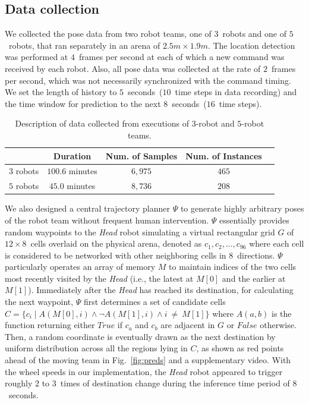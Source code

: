\documentclass[letterpaper, 10 pt, conference]{ieeeconf}  %
\begin{document}
    \subsection{Data collection}

    We collected the pose data from two robot teams, one of
    $3$~robots and one of $5$~robots, that ran separately in an arena of
    $2.5 m \times 1.9 m$. The location detection was performed at
    $4$~frames per second at each of which a new command was received by
    each robot. Also, all pose data was collected at the rate of
    $2$~frames per second, which was not necessarily synchronized with
    the command timing. We set the length of history to
    $5$~seconds~($10$~time steps in data recording) and the time window
    for prediction to the next $8$~seconds~($16$~time steps).
       
    \setlength{\tabcolsep}{0.5em} %
    {\renewcommand{\arraystretch}{1.2}%
    	\begin{table}[t]
    		\centering
    		\begin{tabular}{|c|c|c|c|c|}
    			\hline
    			&  Duration & Num. of Samples & Num. of Instances  \\ \hline
    			$3$ robots & $100.6$ minutes & $6,975$ & $465$  \\ \hline
    			$5$ robots & $45.0$ minutes  & $8,736$ & $208$  \\ \hline
    		\end{tabular}
    		\caption{Description of data collected from executions of $3$-robot and $5$-robot teams.}
    		\label{table:data_description}
    	\end{table}
    }
    We also designed a central trajectory planner $\Psi$ to generate highly 
    arbitrary poses of the robot team without frequent human intervention.
    $\Psi$ essentially provides random waypoints to the \emph{Head} robot simulating a virtual 
    rectangular grid $G$ of $12 \times 8$~cells overlaid on the physical arena,  
    denoted as $c_1, c_2, ..., c_{96}$ where each cell is considered to be networked 
    with other neighboring cells in $8$~directions. 
    $\Psi$ particularly operates an array of memory $M$ to maintain indices of 
    the two cells most recently visited by the \emph{Head} 
    (i.e., the latest at $M[0]$ and the earlier at $M[1]$). 
    Immediately after the \emph{Head} has reached its destination, 
    for calculating the next waypoint, $\Psi$ first determines a set of candidate
    cells $C = \{c_i \mid A(M[0],i) \wedge \neg A(M[1],i) \wedge i~\neq~M[1] \}$ 
	where $A(a,b)$ is the function returning either $True$ if $c_a$ 
	and $c_b$ are adjacent in $G$ or $False$ otherwise. 
    Then, a random coordinate is eventually drawn as the next destination by uniform
    distribution across all the regions lying in $C$, 
    as shown as red points ahead of the moving team in Fig.~\ref{fig:preds} and 
    a supplementary video. 
    With the wheel speeds in our implementation, 
    the \emph{Head} robot appeared to trigger roughly $2$ to $3$~times of destination 
    change during the inference time period of $8$~seconds.
    
\end{document}
